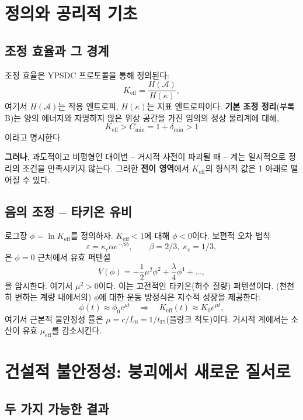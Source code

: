\documentclass[12pt,a4paper]{article}
\newcommand{\Keff}{K_{\mathrm{eff}}}
\begin{document}
	\section{정의와 공리적 기초}
	
	\subsection{조정 효율과 그 경계}
	
	조정 효율은 YPSDC 프로토콜을 통해 정의된다:
	\[
	\Keff = \frac{H(\mathcal{A})}{H(\kappa)},
	\]
	여기서 \(H(\mathcal{A})\)는 작용 엔트로피, \(H(\kappa)\)는 지표 엔트로피이다.
	\textbf{기본 조정 정리}(부록 B)는 양의 에너지와 자명하지 않은 위상 공간을 가진 임의의 정상 물리계에 대해,
	\[
	\Keff > C_{\min} = 1 + \delta_{\min} > 1
	\]
	이라고 명시한다.
	
	\textbf{그러나}, 과도적이고 비평형인 대이변 – 거시적 사전이 파괴될 때 – 계는 일시적으로 정리의 조건을 만족시키지 않는다. 그러한 \textbf{전이 영역}에서 \(\Keff\)의 형식적 값은 1 아래로 떨어질 수 있다.
	
	\subsection{음의 조정 – 타키온 유비}
	
	로그장 \(\phi = \ln \Keff\)를 정의하자. \(\Keff < 1\)에 대해 \(\phi < 0\)이다.
	보편적 오차 법칙
	\[
	\varepsilon = \kappa_c \alpha e^{-\beta \phi}, \qquad \beta = 2/3,\; \kappa_c = 1/3,
	\]
	은 \(\phi = 0\) 근처에서 유효 퍼텐셜
	\[
	V(\phi) = -\frac{1}{2}\mu^2 \phi^2 + \frac{\lambda}{4}\phi^4 + \dots,
	\]
	을 암시한다. 여기서 \(\mu^2 > 0\)이다. 이는 고전적인 타키온(허수 질량) 퍼텐셜이다.
	(천천히 변하는 계량 내에서의) \(\phi\)에 대한 운동 방정식은 지수적 성장을 제공한다:
	\[
	\phi(t) \approx \phi_0 e^{\mu t} \quad\Longrightarrow\quad \Keff(t) \approx K_0 e^{\mu t},
	\]
	여기서 근본적 불안정성 률은 \(\mu = c/L_0 = 1/t_{\mathrm{Pl}}\)(플랑크 척도)이다.
	거시적 계에서는 소산이 유효 \(\mu_{\mathrm{eff}}\)를 감소시킨다.
	
	\section{건설적 불안정성: 붕괴에서 새로운 질서로}
	
	\subsection{두 가지 가능한 결과}
	
\end{document}
